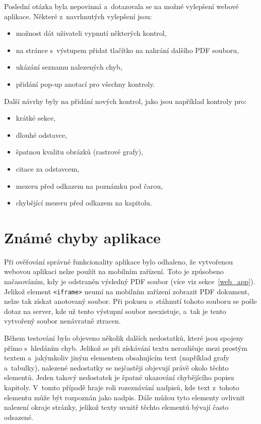 Poslední otázka byla nepovinná a~dotazovala se na možné vylepšení webové
aplikace. Některé z~navrhnutých vylepšení jsou:
\begin{itemize}
    \item možnost dát uživateli vypnutí některých kontrol,
    \item na stránce s~výstupem přidat tlačítko na nahrání dalšího PDF souboru,
    \item ukázání seznamu nalezených chyb,
    \item přidání pop-up anotací pro všechny kontroly.
\end{itemize}
Další návrhy byly na přidání nových kontrol, jako jsou například kontroly pro:
\begin{itemize}
    \item krátké sekce,
    \item dlouhé odstavce,
    \item špatnou kvalitu obrázků (rastrové grafy),
    \item citace za odstavcem,
    \item mezeru před odkazem na poznámku pod čarou,
    \item chybějící mezeru před odkazem na kapitolu.
\end{itemize}



\section{Známé chyby aplikace} \label{app_errors}
Při ověřování správné funkcionality aplikace bylo odhaleno, že vytvořenou webovou aplikaci
nelze použít na mobilním zařízení. Toto je způsobeno načasováním, kdy je odstraněn
výsledný PDF soubor (více viz sekce~\ref{web_app}). Jelikož element
\texttt{<iframe>} neumí na mobilním zařízení zobrazit PDF dokument, nelze tak
získat anotovaný soubor. Při pokusu o~stáhnutí tohoto souboru se pošle dotaz
na server, kde už tento výstupní soubor neexistuje, a~tak je tento vytvořený soubor
nenávratně ztracen.

Během testování bylo objeveno několik dalších nedostatků, které jsou spojeny přímo
s~hledáním chyb. Jelikož se při získávání textu nerozlišuje mezi prostým textem
a~jakýmkoliv jiným elementem obsahujícím text (například grafy a~tabulky),
nalezené nedostatky se nejčastěji objevují právě okolo těchto elementů. 
Jeden takový nedostatek je špatné ukazování chybějícího popisu kapitoly.
V~tomto případě hraje roli rozeznávání nadpisů, kde text z~tohoto elementu
může být rozpoznán jako nadpis. Dále můžou tyto elementy ovlivnit nalezení
okraje stránky, jelikož texty uvnitř těchto elementů bývají často odsazené.

